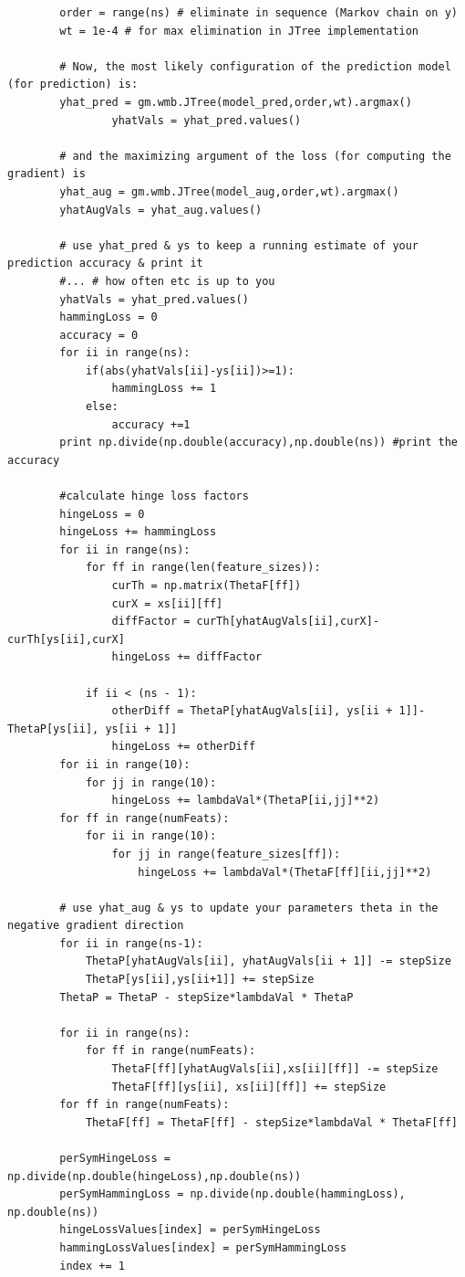 \documentclass[twoside,11pt]{article}
\theoremstyle{definition}
\begin{document}
\begin{lstlisting}
        order = range(ns) # eliminate in sequence (Markov chain on y)
        wt = 1e-4 # for max elimination in JTree implementation

        # Now, the most likely configuration of the prediction model (for prediction) is:
        yhat_pred = gm.wmb.JTree(model_pred,order,wt).argmax()
				yhatVals = yhat_pred.values()
				
        # and the maximizing argument of the loss (for computing the gradient) is
        yhat_aug = gm.wmb.JTree(model_aug,order,wt).argmax()
        yhatAugVals = yhat_aug.values()

        # use yhat_pred & ys to keep a running estimate of your prediction accuracy & print it
        #... # how often etc is up to you
        yhatVals = yhat_pred.values()
        hammingLoss = 0
        accuracy = 0
        for ii in range(ns):
            if(abs(yhatVals[ii]-ys[ii])>=1):
                hammingLoss += 1
            else:
                accuracy +=1
        print np.divide(np.double(accuracy),np.double(ns)) #print the accuracy

        #calculate hinge loss factors
        hingeLoss = 0
        hingeLoss += hammingLoss
        for ii in range(ns):
            for ff in range(len(feature_sizes)):
                curTh = np.matrix(ThetaF[ff])
                curX = xs[ii][ff]
                diffFactor = curTh[yhatAugVals[ii],curX]-curTh[ys[ii],curX]
                hingeLoss += diffFactor

            if ii < (ns - 1):
                otherDiff = ThetaP[yhatAugVals[ii], ys[ii + 1]]-ThetaP[ys[ii], ys[ii + 1]]
                hingeLoss += otherDiff
        for ii in range(10):
            for jj in range(10):
                hingeLoss += lambdaVal*(ThetaP[ii,jj]**2)
        for ff in range(numFeats):
            for ii in range(10):
                for jj in range(feature_sizes[ff]):
                    hingeLoss += lambdaVal*(ThetaF[ff][ii,jj]**2)
										
        # use yhat_aug & ys to update your parameters theta in the negative gradient direction
        for ii in range(ns-1):
            ThetaP[yhatAugVals[ii], yhatAugVals[ii + 1]] -= stepSize
            ThetaP[ys[ii],ys[ii+1]] += stepSize
        ThetaP = ThetaP - stepSize*lambdaVal * ThetaP

        for ii in range(ns):
            for ff in range(numFeats):
                ThetaF[ff][yhatAugVals[ii],xs[ii][ff]] -= stepSize
                ThetaF[ff][ys[ii], xs[ii][ff]] += stepSize
        for ff in range(numFeats):
            ThetaF[ff] = ThetaF[ff] - stepSize*lambdaVal * ThetaF[ff]

        perSymHingeLoss = np.divide(np.double(hingeLoss),np.double(ns))
        perSymHammingLoss = np.divide(np.double(hammingLoss), np.double(ns))
        hingeLossValues[index] = perSymHingeLoss
        hammingLossValues[index] = perSymHammingLoss
        index += 1

\end{lstlisting}
\end{document}
